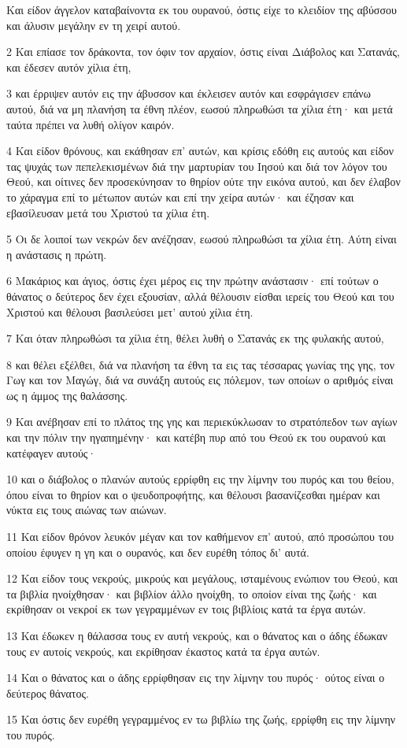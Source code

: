 \par Και είδον άγγελον καταβαίνοντα εκ του ουρανού, όστις είχε το κλειδίον της αβύσσου και άλυσιν μεγάλην εν τη χειρί αυτού.
\par 2 Και επίασε τον δράκοντα, τον όφιν τον αρχαίον, όστις είναι Διάβολος και Σατανάς, και έδεσεν αυτόν χίλια έτη,
\par 3 και έρριψεν αυτόν εις την άβυσσον και έκλεισεν αυτόν και εσφράγισεν επάνω αυτού, διά να μη πλανήση τα έθνη πλέον, εωσού πληρωθώσι τα χίλια έτη· και μετά ταύτα πρέπει να λυθή ολίγον καιρόν.
\par 4 Και είδον θρόνους, και εκάθησαν επ' αυτών, και κρίσις εδόθη εις αυτούς και είδον τας ψυχάς των πεπελεκισμένων διά την μαρτυρίαν του Ιησού και διά τον λόγον του Θεού, και οίτινες δεν προσεκύνησαν το θηρίον ούτε την εικόνα αυτού, και δεν έλαβον το χάραγμα επί το μέτωπον αυτών και επί την χείρα αυτών· και έζησαν και εβασίλευσαν μετά του Χριστού τα χίλια έτη.
\par 5 Οι δε λοιποί των νεκρών δεν ανέζησαν, εωσού πληρωθώσι τα χίλια έτη. Αύτη είναι η ανάστασις η πρώτη.
\par 6 Μακάριος και άγιος, όστις έχει μέρος εις την πρώτην ανάστασιν· επί τούτων ο θάνατος ο δεύτερος δεν έχει εξουσίαν, αλλά θέλουσιν είσθαι ιερείς του Θεού και του Χριστού και θέλουσι βασιλεύσει μετ' αυτού χίλια έτη.
\par 7 Και όταν πληρωθώσι τα χίλια έτη, θέλει λυθή ο Σατανάς εκ της φυλακής αυτού,
\par 8 και θέλει εξέλθει, διά να πλανήση τα έθνη τα εις τας τέσσαρας γωνίας της γης, τον Γωγ και τον Μαγώγ, διά να συνάξη αυτούς εις πόλεμον, των οποίων ο αριθμός είναι ως η άμμος της θαλάσσης.
\par 9 Και ανέβησαν επί το πλάτος της γης και περιεκύκλωσαν το στρατόπεδον των αγίων και την πόλιν την ηγαπημένην· και κατέβη πυρ από του Θεού εκ του ουρανού και κατέφαγεν αυτούς·
\par 10 και ο διάβολος ο πλανών αυτούς ερρίφθη εις την λίμνην του πυρός και του θείου, όπου είναι το θηρίον και ο ψευδοπροφήτης, και θέλουσι βασανίζεσθαι ημέραν και νύκτα εις τους αιώνας των αιώνων.
\par 11 Και είδον θρόνον λευκόν μέγαν και τον καθήμενον επ' αυτού, από προσώπου του οποίου έφυγεν η γη και ο ουρανός, και δεν ευρέθη τόπος δι' αυτά.
\par 12 Και είδον τους νεκρούς, μικρούς και μεγάλους, ισταμένους ενώπιον του Θεού, και τα βιβλία ηνοίχθησαν· και βιβλίον άλλο ηνοίχθη, το οποίον είναι της ζωής· και εκρίθησαν οι νεκροί εκ των γεγραμμένων εν τοις βιβλίοις κατά τα έργα αυτών.
\par 13 Και έδωκεν η θάλασσα τους εν αυτή νεκρούς, και ο θάνατος και ο άδης έδωκαν τους εν αυτοίς νεκρούς, και εκρίθησαν έκαστος κατά τα έργα αυτών.
\par 14 Και ο θάνατος και ο άδης ερρίφθησαν εις την λίμνην του πυρός· ούτος είναι ο δεύτερος θάνατος.
\par 15 Και όστις δεν ευρέθη γεγραμμένος εν τω βιβλίω της ζωής, ερρίφθη εις την λίμνην του πυρός.

